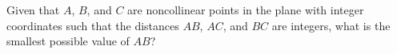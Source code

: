Given that $A$, $B$, and $C$ are noncollinear points in the plane with integer coordinates
such that the distances $AB$, $AC$, and $BC$ are integers, what is the smallest possible value of $AB$?
